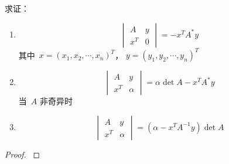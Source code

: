 \documentclass[twoside,openright]{book}
\begin{document}
\begin{CJK*}{UTF8}{}
\begin{quest}
\label{quest:73}
求证：
\begin{enumerate}
\item
\[
\begin{vmatrix} A & y \\ x^T & 0 \end{vmatrix} = - x^T A^* y
\]
其中\ $x = (x_1, x_2, \dotsm, x_n)^T$，
$y = (y_1, y_2, \dotsm, y_n)^T$
\item
\[
\begin{vmatrix} A & y \\ x^T & \alpha \end{vmatrix} = \alpha \det{A} - x^T A^* y
\]
当\ $A$ 非奇异时
\item
\[
\begin{vmatrix} A & y \\ x^T & \alpha \end{vmatrix} = \left( \alpha - x^T A^{-1} y \right) \det{A}
\]
\end{enumerate}
\end{quest}
\begin{proof}
$ $


\end{proof}
\end{CJK*}
\end{document}
